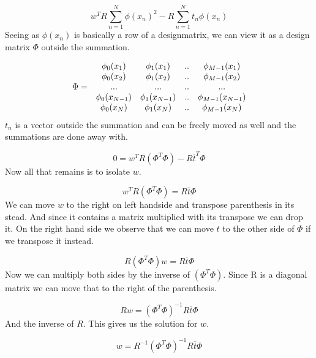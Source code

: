 \documentclass{article}
\begin{document}
\begin{equation*}
    w^T R \sum_{n=1}^{N} \phi(x_n)^2 - R \sum_{n=1}^{N} t_n \phi(x_n) 
\end{equation*}
Seeing as $\phi(x_n)$ is basically a row of a designmatrix, we can view it
as a design matrix $\Phi$ outside the summation.

\begin{equation*}
    \begin{array}{r c c c c}
        &  \phi_0(x_1) & \phi_1(x_1)   & .. & \phi_{M-1}(x_1) \\
        &  \phi_0(x_2) & \phi_1(x_2)   & .. & \phi_{M-1}(x_2) \\
  \Phi =   &  ...  & ... & .. & ...   \\
           &  \phi_0(x_{N-1}) & \phi_1(x_{N-1})   & .. & \phi_{M-1}(x_{N-1}) \\
        &  \phi_0(x_N) & \phi_1(x_N)   & .. & \phi_{M-1}(x_N) 
    \end{array}
\end{equation*}
$t_n$ is a vector outside the summation and can be freely moved as well
and the summations are done away with. 

\begin{equation*}
  0 = w^T R (\Phi^T \Phi) - R \bar{t}^T \Phi 
\end{equation*}
Now all that remains is to isolate $w$.

\begin{equation*}
  w^T R (\Phi^T \Phi) = R \bar{t} \Phi 
\end{equation*}
We can move $w$ to the right on left handside and transpose parenthesis in
its stead. And since it contains a matrix multiplied with its transpose we
can drop it. On the right hand side we observe that we can move $t$ to the
other side of $\Phi$ if we transpose it instead. 

\begin{equation*}
  R (\Phi^T \Phi) w = R \bar{t} \Phi 
\end{equation*}
Now we can multiply both sides by the inverse of $(\Phi^T \Phi)$. Since R
is a diagonal matrix we can move that to the right of the parenthesis.

\begin{equation*}
  R w = (\Phi^T \Phi)^{-1} R \bar{t} \Phi 
\end{equation*}
And the inverse of $R$. This gives us the solution for $w$.

\begin{equation*}
  w = R^{-1}(\Phi^T \Phi)^{-1} R \bar{t} \Phi 
\end{equation*}
\end{document}
